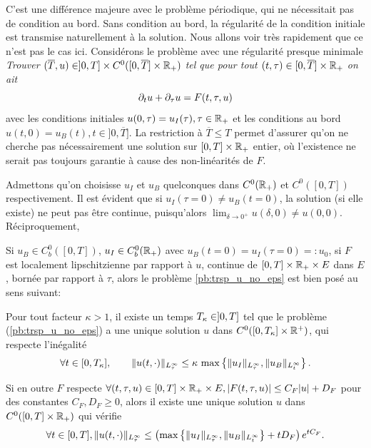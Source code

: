 C'est une différence majeure avec le problème périodique, qui ne nécessitait pas de condition au bord. 
Sans condition au bord, la régularité de la condition initiale est transmise naturellement à la solution. Nous allons voir très rapidement que ce n'est pas le cas ici. 
Considérons le problème avec une régularité presque minimale \\
\textit{Trouver $(\overline{T},u)\in]0,T]\times C^0([0,\overline{T}]\times\mathbb{R}_+)$ tel que pour tout $(t,\tau)\in[0,\overline{T}]\times\mathbb{R}_+$ on ait }
\begin{equation} \label{pb:trsp_u_no_eps}
\partial_t u + \partial_{\tau} u = F(t,\tau,u) 
\end{equation}
avec les conditions initiales $u(0,\tau) = u_I(\tau), \tau\in\mathbb{R}_+$ et les conditions au bord $u(t,0) = u_B(t), t\in]0,\overline{T}]$. 
La restriction à $\overline{T} \leq T$ permet d'assurer qu'on ne cherche pas nécessairement une solution sur $[0,T]\times\mathbb{R}_+$ entier, où l'existence ne serait pas toujours garantie à cause des non-linéarités de $F$. 

Admettons qu'on choisisse $u_I$ et $u_B$ quelconques dans $C^0(\mathbb{R}_+)$ et $C^0([0,T])$ respectivement. 
Il est évident que si $u_I(\tau = 0) \neq u_B(t=0)$, la solution (si elle existe) ne peut pas être continue, puisqu'alors $\lim_{\delta\rightarrow 0^+} u(\delta,0) \neq u(0,0)$. 
Réciproquement, 
\begin{lemma} \label{thm:pb_gen_bien_pose}
Si $u_B\in C^0_b([0,T])$, $u_I \in C^0_b(\mathbb{R}_+)$ avec $u_B(t=0) = u_I(\tau = 0) =: u_0$, si $F$ est localement lipschitzienne par rapport à $u$, continue de $[0,T]\times\mathbb{R}_+\times E$ dans $E$, bornée par rapport à $\tau$, alors le problème \eqref{pb:trsp_u_no_eps} est bien posé au sens suivant: 
 
Pour tout facteur $\kappa > 1$, il existe un temps $T_{\kappa}\in]0,T]$ tel que le problème (\ref{pb:trsp_u_no_eps}) a une unique solution $u$ dans $C^0([0,T_{\kappa}]\times\mathbb{R}^+)$, qui respecte l'inégalité 
\begin{equation}
\forall t\in [0,T_{\kappa}], \qquad \|u(t,\cdot) \|_{L^{\infty}_{\tau}} \leq \kappa\, \max\left\{ \|u_I\|_{L^{\infty}_{\tau}}, \|u_B\|_{L^{\infty}_t} \right\}. 
\end{equation}

Si en outre $F$ respecte $\forall (t,\tau,u)\in [0,T]\times\mathbb{R}_+\times E, |F(t,\tau,u)| \leq C_F |u| + D_F$ pour des constantes $C_F,D_F \geq 0$, alors il existe une unique solution $u$ dans $C^0([0,T]\times\mathbb{R}_+)$ qui vérifie 
\begin{equation}
\forall t\in[0,T], \|u(t,\cdot)\|_{L^{\infty}_{\tau}} \leq \left( \max\left\{ \|u_I\|_{L^{\infty}_{\tau}}, \|u_B\|_{L^{\infty}_t} \right\} + t D_F \right) e^{t C_F}. 
\label{eq:ineg_lin_u}
\end{equation}

\end{lemma}

